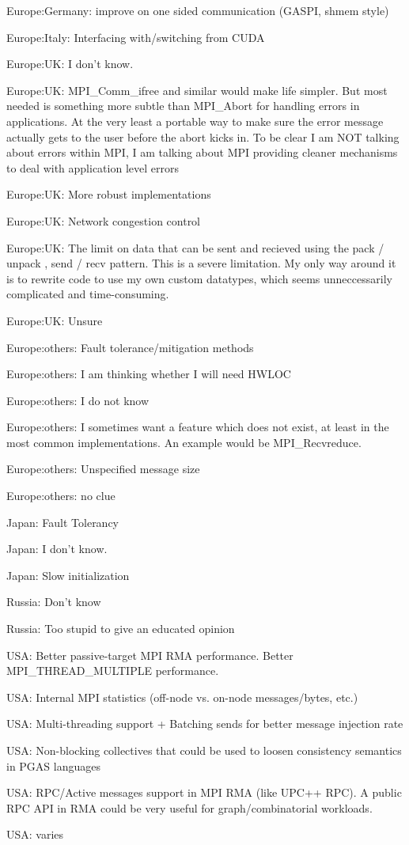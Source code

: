 \item Europe:Germany: improve on one sided communication (GASPI, shmem style)
\item Europe:Italy: Interfacing with/switching from CUDA
\item Europe:UK: I don't know.
\item Europe:UK: MPI\_Comm\_ifree and similar would make life simpler. But most needed is something more subtle than MPI\_Abort for handling errors in applications. At the very least a portable way to make sure the error message actually gets to the user before the abort kicks in. To be clear I am NOT talking about errors within MPI, I am talking about MPI providing cleaner mechanisms to deal with application level errors
\item Europe:UK: More robust implementations
\item Europe:UK: Network congestion control
\item Europe:UK: The limit on data that can be sent and recieved using the pack / unpack , send / recv pattern. This is a severe limitation. My only way around it is to rewrite code to use my own custom datatypes, which seems unneccessarily complicated and time-consuming.
\item Europe:UK: Unsure
\item Europe:others: Fault tolerance/mitigation methods
\item Europe:others: I am thinking whether I will need HWLOC
\item Europe:others: I do not know
\item Europe:others: I sometimes want a feature which does not exist, at least in the most common implementations. An example would be MPI\_Recvreduce.
\item Europe:others: Unspecified message size
\item Europe:others: no clue
\item Japan: Fault Tolerancy
\item Japan: I don't know.
\item Japan: Slow initialization
\item Russia: Don't know
\item Russia: Too stupid to give an educated opinion
\item USA: Better passive-target MPI RMA performance. Better MPI\_THREAD\_MULTIPLE performance.
\item USA: Internal MPI statistics (off-node vs. on-node messages/bytes, etc.)
\item USA: Multi-threading support + Batching sends for better message injection rate
\item USA: Non-blocking collectives that could be used to loosen consistency semantics in PGAS languages
\item USA: RPC/Active messages support in MPI RMA (like UPC++ RPC). A public RPC API in RMA could be very useful for graph/combinatorial workloads.
\item USA: varies

